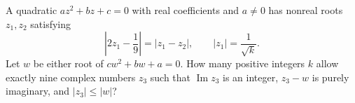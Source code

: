 A quadratic $az^2+bz+c=0$ with real coefficients and $a\ne0$ has nonreal roots $z_1,z_2$ satisfying
\[
\left|2z_1-\dfrac{1}{9}\right|=|z_1-z_2|,\qquad |z_1|=\dfrac{1}{\sqrt k}.
\]
Let $w$ be either root of $cw^2+bw+a=0$. How many positive integers $k$ allow exactly nine complex numbers $z_3$ such that $\operatorname{Im}z_3$ is an integer, $z_3-w$ is purely imaginary, and $|z_3|\le|w|$?
